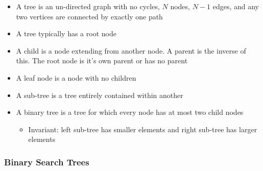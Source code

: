 \documentclass{article}
\begin{document}
\begin{itemize}
    \item A tree is an un-directed graph with no cycles, $N$ nodes, $N-1$ edges, and any two vertices are connected by exactly one path
    \item A tree typically has a root node
    \item A child is a node extending from another node. A parent is the inverse of this. The root node is it's own parent or has no parent
    \item A leaf node is a node with no children
    \item A sub-tree is a tree entirely contained within another
    \item A binary tree is a tree for which every node has at most two child nodes
    \begin{itemize}
        \item Invariant: left sub-tree has smaller elements and right sub-tree has larger elements
    \end{itemize}
\end{itemize}

\subsubsection{Binary Search Trees}
\end{document}
